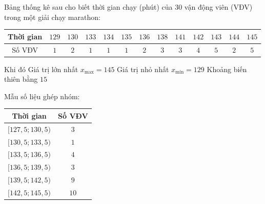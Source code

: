 \begin{ex}%
 Bảng thống kê sau cho biết thời gian chạy (phút) của $30$ vận động viên (VĐV) trong  một giải chạy marathon:
 \begin{center}
  \begin{tabular}{|c|c|c|c|c|c|c|c|c|c|c|c|c|}
   \hline 
   Thời  gian & $129$ & $130$ & $133$ & $134$ & $135$ & $136$ & $138$ & $141$ & $142$ & $143$ & $144$ & $145$ \\
   \hline 
   Số VĐV & $1$ & $2$ & $1$ & $1$ & $1$  & $2$ & $3$ & $3$ & $4$ & $5$ & $2$ & $5$ \\
   \hline 
  \end{tabular}
 \end{center}
  Khi đó
  \choiceTF
  {\True Giá  trị lớn nhất $x_{\max}=145$}
  {\True Giá trị nhỏ nhất  $x_{\text{min}}=129$}
  {Khoảng biến thiên bằng  $15$}
   {Mẫu số liệu ghép nhóm:\\
  \begin{tabular}{|c|c|}
   \hline 
   Thời gian &  Số VĐV \\
    \hline
   $[127{,}5; 130{,}5)$ & $3$  \\
    \hline
   $[130{,}5; 133{,}5)$ &  $1$ \\
   \hline 
   $[133{,}5; 136{,}5)$ &  $4$ \\
    \hline
   $[136{,}5;  139{,}5)$ & $3$ \\
   \hline 
   $[139{,}5; 142{,}5)$ &  $9$ \\
   \hline 
   $[142{,}5; 145{,}5)$ & $10$ \\ 
    \hline
 \end{tabular}
 } 
\end{ex}
